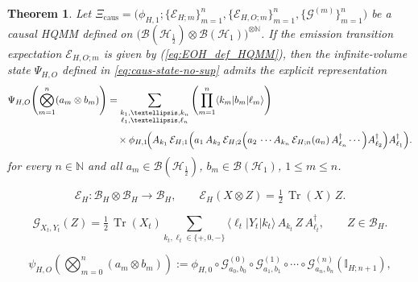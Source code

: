 \documentclass[10pt,a4paper]{amsart}
\newtheorem{theorem}{Theorem}
\begin{document}
 \begin{theorem}
\label{thm:causal-state-kraus}
Let $\Xi_{\mathrm{caus}} = \bigl(\phi_{H,1}; \{\mathcal{E}_{H;m}\}_{m=1}^{n}, \{\mathcal{E}_{H,O;m}\}_{m=1}^{n}, \{\mathcal{G}^{(m)}\}_{m=1}^{n}\bigr)$ be a causal HQMM defined on $\bigl(\mathcal{B}(\mathcal{H}_{\frac{1}{2}})\otimes \mathcal{B}(\mathcal{H}_{1})\bigr)^{\otimes \mathbb{N}}$. If the emission transition expectation $\mathcal{E}_{H,O;m}$ is given by \textnormal{(\ref{eq:EOH_def_HQMM})}, then the infinite-volume state $\Psi_{H,O}$ defined in \textnormal{\eqref{eq:caus-state-no-sup}} admits the explicit representation
\begin{align}
\Psi_{H,O}\!\left(\bigotimes_{m=1}^n (a_m\otimes b_m)\right)
&=
\sum_{\substack{k_1,\dots,k_n\\ \ell_1,\dots,\ell_n}}
\left(\prod_{m=1}^n \langle k_m|b_m|\ell_m\rangle\right)
\nonumber\\[0.3em]
&\quad\times
\phi_{H,1}\!\Bigl(
A_{k_1}\,
\mathcal{E}_{H;1}\Bigl(
a_1\,
A_{k_2}\,
\mathcal{E}_{H;2}\Bigl(
a_2\,
\cdots
A_{k_n}\,\mathcal{E}_{H;n}(a_n)\,
A_{\ell_n}^\dagger
\cdots
\Bigr)
A_{\ell_2}^\dagger
\Bigr)
A_{\ell_1}^\dagger
\Bigr).
\label{eq:psi-explicit-compact2}
\end{align}
for every $n\in\mathbb{N}$ and all $a_m\in \mathcal{B}(\mathcal{H}_{\frac{1}{2}})$, $b_m\in \mathcal{B}(\mathcal{H}_{1})$, $1\le m\le n$.
\end{theorem}

\begin{equation}\label{eq:E_H_def}
\mathcal{E}_{H}:\mathcal{B}_H\otimes\mathcal{B}_H\longrightarrow\mathcal{B}_H,
\qquad
\mathcal{E}_{H}(X\otimes Z)
=
\tfrac{1}{2}\,\operatorname{Tr}(X)\,Z.
\end{equation}

\begin{equation}\label{eq:G_single_step_def-prep}
\mathcal{G}_{X_t,Y_t}(Z)
=
\tfrac{1}{2}\,\operatorname{Tr}(X_t)
\sum_{k_t,\ell_t\in\{+,0,-\}}
\langle \ell_t|Y_t|k_t\rangle\,
A_{k_t}\,Z\,A_{\ell_t}^{\dagger},
\qquad Z\in\mathcal{B}_H.
\end{equation}

\begin{equation}\label{eq:caus-state-no-sup}
\psi_{H,O}\!\left(\bigotimes_{m=0}^n (a_m\otimes b_m)\right)
:=
\phi_{H,0}\circ
\mathcal{G}^{(0)}_{a_0,b_0}\circ\mathcal{G}^{(1)}_{a_1,b_1}\circ\cdots\circ
\mathcal{G}^{(n)}_{a_n,b_n}(\mathbb{I}_{H;n+1}),
\end{equation}
\end{document}
